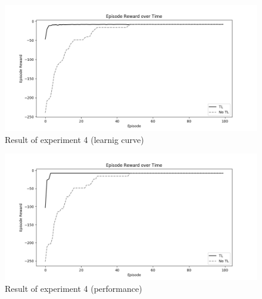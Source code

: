 \begin{figure}[!htb]
\centering
\includegraphics[width=1.0\textwidth]{./figures/experiment5_training}
\caption{Result of experiment 4 (learnig curve)}
\label{experiment5_training}
\end{figure}

\begin{figure}[!htb]
\centering
\includegraphics[width=1.0\textwidth]{./figures/experiment5_test}
\caption{Result of experiment 4 (performance)}
\label{experiment5_test}
\end{figure}


